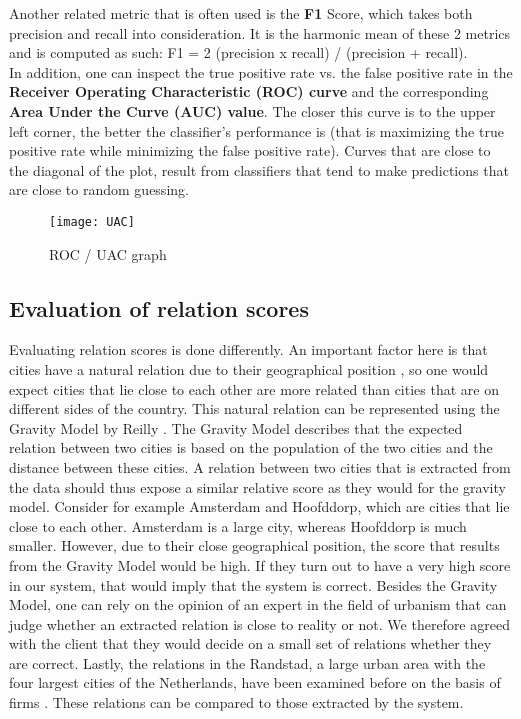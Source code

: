 Another related metric that is often used is the \textbf{F1} Score, which takes both precision and recall into consideration. It is the harmonic mean of these 2 metrics and is computed as such: F1 = 2 (precision x recall) / (precision + recall). \\

In addition, one can inspect the true positive rate vs. the false positive rate in the \textbf{Receiver Operating Characteristic (ROC) curve} and the corresponding \textbf{Area Under the Curve (AUC) value}. The closer this curve is to the upper left corner, the better the classifier’s performance is (that is maximizing the true positive rate while minimizing the false positive rate). Curves that are close to the diagonal of the plot, result from classifiers that tend to make predictions that are close to random guessing. 

\begin{figure}[h]
\centering
\texttt{[image: UAC]}
\caption{ROC / UAC graph \protect\footnotemark{}}
\label{fig:UAC}
\end{figure}

\subsection{Evaluation of relation scores}
Evaluating relation scores is done differently. An important factor here is that cities have a natural relation due to their geographical position \cite{tobler1970computer}, so one would expect cities that lie close to each other are more related than cities that are on different sides of the country. This natural relation can be represented using the Gravity Model by Reilly \cite{reilly1931law}. The Gravity Model describes that the expected relation between two cities is based on the population of the two cities and the distance between these cities. A relation between two cities that is extracted from the data should thus expose a similar relative score as they would for the gravity model. Consider for example Amsterdam and Hoofddorp, which are cities that lie close to each other. Amsterdam is a large city, whereas Hoofddorp is much smaller. However, due to their close geographical position, the score that results from the Gravity Model would be high. If they turn out to have a very high score in our system, that would imply that the system is correct. Besides the Gravity Model, one can rely on the opinion of an expert in the field of urbanism that can judge whether an extracted relation is close to reality or not. We therefore agreed with the client that they would decide on a small set of relations whether they are correct. Lastly, the relations in the Randstad, a large urban area with the four largest cities of the Netherlands, have been examined before on the basis of firms \cite{van2010economic}. These relations can be compared to those extracted by the system.